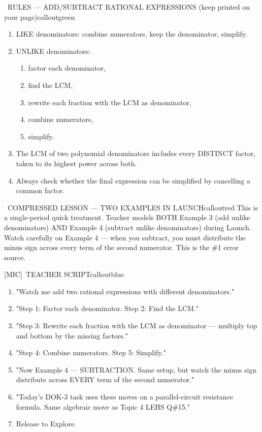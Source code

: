 \documentclass[11pt]{article}
\newcommand{\IconMic}{[MIC]}
\begin{document}
\begin{callout}{\IconBook\ RULES --- ADD/SUBTRACT RATIONAL EXPRESSIONS (keep printed on your page)}{calloutgreen}
\begin{enumerate}[leftmargin=1.6em,itemsep=2pt,topsep=2pt]
\item LIKE denominators: combine numerators, keep the denominator, simplify.
\item UNLIKE denominators:
  \begin{enumerate}[label=(\alph*),leftmargin=1.8em,itemsep=1pt,topsep=1pt]
  \item factor each denominator,
  \item find the LCM,
  \item rewrite each fraction with the LCM as denominator,
  \item combine numerators,
  \item simplify.
  \end{enumerate}
\item The LCM of two polynomial denominators includes every DISTINCT factor, taken to its highest power across both.
\item Always check whether the final expression can be simplified by cancelling a common factor.
\end{enumerate}
\end{callout}

\begin{callout}{\IconWarn\ COMPRESSED LESSON --- TWO EXAMPLES IN LAUNCH}{calloutred}
This is a single-period quick treatment. Teacher models BOTH Example 3 (add unlike denominators) AND Example 4 (subtract unlike denominators) during Launch.\\
Watch carefully on Example 4 --- when you subtract, you must distribute the minus sign across every term of the second numerator. This is the \#1 error source.
\end{callout}

\begin{callout}{\IconMic\ TEACHER SCRIPT}{calloutblue}
\begin{enumerate}[leftmargin=1.5em,itemsep=2pt,topsep=2pt]
\item "Watch me add two rational expressions with different denominators."
\item "Step 1: Factor each denominator. Step 2: Find the LCM."
\item "Step 3: Rewrite each fraction with the LCM as denominator --- multiply top and bottom by the missing factors."
\item "Step 4: Combine numerators. Step 5: Simplify."
\item "Now Example 4 --- SUBTRACTION. Same setup, but watch the minus sign distribute across EVERY term of the second numerator."
\item "Today's DOK-3 task uses these moves on a parallel-circuit resistance formula. Same algebraic move as Topic 4 LEHS Q\#15."
\item Release to Explore.
\end{enumerate}
\end{callout}
\end{document}
